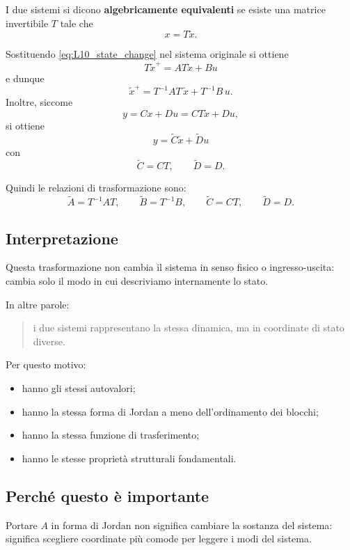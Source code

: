 I due sistemi si dicono \textbf{algebricamente equivalenti} se esiste una matrice invertibile $T$ tale che
\begin{equation}
x=T\tilde x.
\label{eq:L10_state_change}
\end{equation}

Sostituendo \eqref{eq:L10_state_change} nel sistema originale si ottiene
\[
T\tilde x^{+}=AT\tilde x+Bu
\]
e dunque
\[
\tilde x^{+}=T^{-1}AT\,\tilde x + T^{-1}B\,u.
\]
Inoltre, siccome
\[
y=Cx+Du=CT\tilde x+Du,
\]
si ottiene
\[
y=\tilde C \tilde x+\tilde D u
\]
con
\[
\tilde C=CT,
\qquad
\tilde D=D.
\]

Quindi le relazioni di trasformazione sono:
\begin{equation}
\boxed{
\tilde A=T^{-1}AT,\qquad
\tilde B=T^{-1}B,\qquad
\tilde C=CT,\qquad
\tilde D=D.
}
\label{eq:L10_similarity_system}
\end{equation}

\subsection{Interpretazione}

Questa trasformazione non cambia il sistema in senso fisico o ingresso-uscita: cambia solo il modo in cui descriviamo internamente lo stato.

In altre parole:
\begin{quote}
i due sistemi rappresentano la stessa dinamica, ma in coordinate di stato diverse.
\end{quote}

Per questo motivo:
\begin{itemize}
    \item hanno gli stessi autovalori;
    \item hanno la stessa forma di Jordan a meno dell'ordinamento dei blocchi;
    \item hanno la stessa funzione di trasferimento;
    \item hanno le stesse proprietà strutturali fondamentali.
\end{itemize}

\subsection{Perché questo è importante}

Portare $A$ in forma di Jordan non significa cambiare la sostanza del sistema: significa scegliere coordinate più comode per leggere i modi del sistema.

